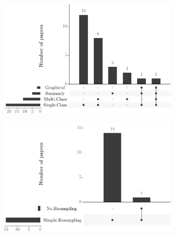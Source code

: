 \begin{figure}[!htp]
  \begin{subfigure}{.49\textwidth}
    \centering
    \includegraphics[width=\textwidth]{figures/distribution-by-evaluation-measure-category-in-ups.pdf}
    \caption{}
    \label{fig:distribution_by_evaluation_measure_category}
  \end{subfigure}\hfill
  \begin{subfigure}{.49\textwidth}
    \centering
    \includegraphics[width=\textwidth]{figures/distribution-by-sampling-method-category-in-ups.pdf}
    \caption{} 
    \label{fig:distribution_by_sampling_method_category}
  \end{subfigure}\hfill
  \begin{subfigure}{.49\textwidth}
    \centering

\end{subfigure}
\end{figure}
